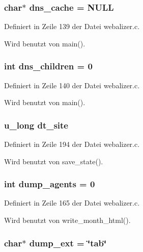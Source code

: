 \subsubsection{\setlength{\rightskip}{0pt plus 5cm}char$\ast$ {\bf dns\_\-cache} = NULL}\label{webalizer_8c_3cb74b5ee16f5910ee70cc4944d1300a}




Definiert in Zeile 139 der Datei webalizer.c.

Wird benutzt von main().
\subsubsection{\setlength{\rightskip}{0pt plus 5cm}int {\bf dns\_\-children} = 0}\label{webalizer_8c_90492045766d92f08b5e160135ade65c}




Definiert in Zeile 140 der Datei webalizer.c.

Wird benutzt von main().
\subsubsection{\setlength{\rightskip}{0pt plus 5cm}u\_\-long {\bf dt\_\-site}}\label{webalizer_8c_f80cf0d40e63789f26cf6ee643eb3b4c}




Definiert in Zeile 194 der Datei webalizer.c.

Wird benutzt von save\_\-state().
\subsubsection{\setlength{\rightskip}{0pt plus 5cm}int {\bf dump\_\-agents} = 0}\label{webalizer_8c_95b4dacf3a1c2e18715bfbd268726afb}




Definiert in Zeile 165 der Datei webalizer.c.

Wird benutzt von write\_\-month\_\-html().
\subsubsection{\setlength{\rightskip}{0pt plus 5cm}char$\ast$ {\bf dump\_\-ext} = \char`\"{}tab\char`\"{}}\label{webalizer_8c_b11b451e9eab811058070fddc7f42efb}




